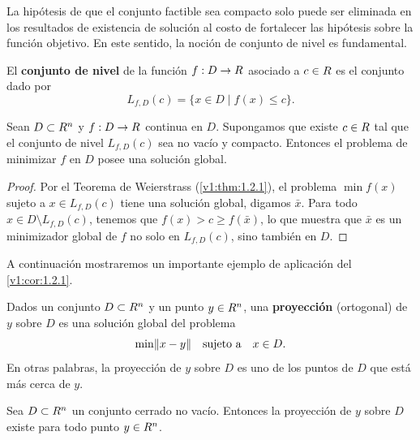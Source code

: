 La hipótesis de que el conjunto factible sea compacto solo puede ser eliminada en los resultados de existencia de solución al costo de fortalecer las hipótesis sobre la función objetivo. En este sentido, la noción de conjunto de nivel es fundamental.

\begin{definition}\label{v1:def:1.2.1}
    El \textbf{conjunto de nivel} de la función $f : D \to R$ asociado a $c \in R$ es el conjunto dado por
    \[
        L_{f,D}(c) = \{x \in D \mid f(x) \le c\}.
    \]
\end{definition}

\begin{corollary}\label{v1:cor:1.2.1}
    Sean $D \subset R^n$ y $f : D \to R$ continua en $D$. Supongamos que existe $c \in R$ tal que el conjunto de nivel $L_{f,D}(c)$ sea no vacío y compacto. Entonces el problema de minimizar $f$ en $D$ posee una solución global.
\end{corollary}

\begin{proof}
    Por el Teorema de Weierstrass (\cref{v1:thm:1.2.1}), el problema $\min f(x)$ sujeto a $x \in L_{f,D}(c)$ tiene una solución global, digamos $\bar{x}$. Para todo $x \in D \setminus L_{f,D}(c)$, tenemos que $f(x) > c \ge f(\bar{x})$, lo que muestra que $\bar{x}$ es un minimizador global de $f$ no solo en $L_{f,D}(c)$, sino también en $D$.
\end{proof}

A continuación mostraremos un importante ejemplo de aplicación del \cref{v1:cor:1.2.1}.

\begin{definition}\label{v1:def:1.2.2}
    Dados un conjunto $D \subset R^n$ y un punto $y \in R^n$, una \textbf{proyección} (ortogonal) de $y$ sobre $D$ es una solución global del problema
    \[
        \min \lVert x - y\rVert \quad \text{sujeto a} \quad x \in D.
    \]
    En otras palabras, la proyección de $y$ sobre $D$ es uno de los puntos de $D$ que está más cerca de $y$.
\end{definition}

\begin{corollary}\label{v1:cor:1.2.2}
    Sea $D \subset R^n$ un conjunto cerrado no vacío. Entonces la proyección de $y$ sobre $D$ existe para todo punto $y \in R^n$.
\end{corollary}

